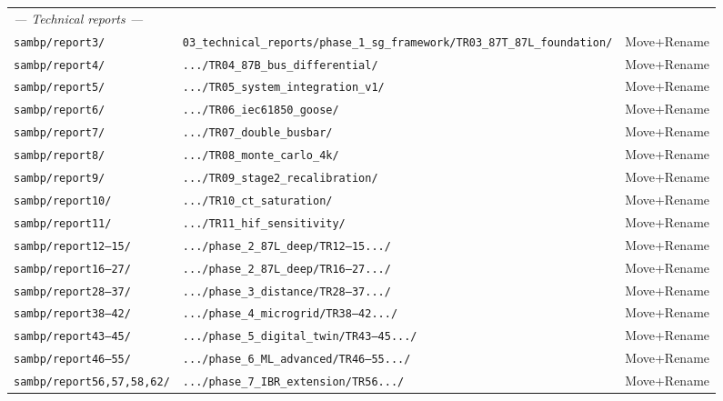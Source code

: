\documentclass[11pt,a4paper]{article}
\newcommand{\cmd}[1]{\texttt{\small #1}}
\begin{document}
\begin{longtable}{p{5.2cm}p{6.8cm}l}
\multicolumn{3}{l}{\textit{--- Technical reports ---}} \\
\cmd{sambp/report3/} & \cmd{03\_technical\_reports/phase\_1\_sg\_framework/TR03\_87T\_87L\_foundation/} & Move+Rename \\
\cmd{sambp/report4/} & \cmd{.../TR04\_87B\_bus\_differential/} & Move+Rename \\
\cmd{sambp/report5/} & \cmd{.../TR05\_system\_integration\_v1/} & Move+Rename \\
\cmd{sambp/report6/} & \cmd{.../TR06\_iec61850\_goose/} & Move+Rename \\
\cmd{sambp/report7/} & \cmd{.../TR07\_double\_busbar/} & Move+Rename \\
\cmd{sambp/report8/} & \cmd{.../TR08\_monte\_carlo\_4k/} & Move+Rename \\
\cmd{sambp/report9/} & \cmd{.../TR09\_stage2\_recalibration/} & Move+Rename \\
\cmd{sambp/report10/} & \cmd{.../TR10\_ct\_saturation/} & Move+Rename \\
\cmd{sambp/report11/} & \cmd{.../TR11\_hif\_sensitivity/} & Move+Rename \\
\cmd{sambp/report12--15/} & \cmd{.../phase\_2\_87L\_deep/TR12--15.../} & Move+Rename \\
\cmd{sambp/report16--27/} & \cmd{.../phase\_2\_87L\_deep/TR16--27.../} & Move+Rename \\
\cmd{sambp/report28--37/} & \cmd{.../phase\_3\_distance/TR28--37.../} & Move+Rename \\
\cmd{sambp/report38--42/} & \cmd{.../phase\_4\_microgrid/TR38--42.../} & Move+Rename \\
\cmd{sambp/report43--45/} & \cmd{.../phase\_5\_digital\_twin/TR43--45.../} & Move+Rename \\
\cmd{sambp/report46--55/} & \cmd{.../phase\_6\_ML\_advanced/TR46--55.../} & Move+Rename \\
\cmd{sambp/report56,57,58,62/} & \cmd{.../phase\_7\_IBR\_extension/TR56.../} & Move+Rename \\[4pt]


\end{longtable}
\end{document}
